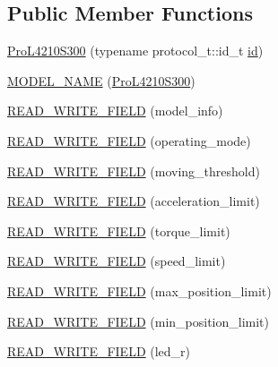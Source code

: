 \subsection*{Public Member Functions}
\begin{DoxyCompactItemize}
\item 
\hyperlink{classdynamixel_1_1servos_1_1_pro_l4210_s300_aac61a7d8079c7f0b1451c407cf445910}{Pro\+L4210\+S300} (typename protocol\+\_\+t\+::id\+\_\+t \hyperlink{classdynamixel_1_1servos_1_1_servo_a2d022081672e25a7bb57b76706e1cc57}{id})
\item 
\hyperlink{classdynamixel_1_1servos_1_1_pro_l4210_s300_a2588c27b6be26cd7cf28cdaf284598e0}{M\+O\+D\+E\+L\+\_\+\+N\+A\+ME} (\hyperlink{classdynamixel_1_1servos_1_1_pro_l4210_s300}{Pro\+L4210\+S300})
\item 
\hyperlink{classdynamixel_1_1servos_1_1_pro_l4210_s300_a21992eb966c85d02c5bb45d357d4ffb7}{R\+E\+A\+D\+\_\+\+W\+R\+I\+T\+E\+\_\+\+F\+I\+E\+LD} (model\+\_\+info)
\item 
\hyperlink{classdynamixel_1_1servos_1_1_pro_l4210_s300_a3d7738f77a3dd53dcb60d88c949d7a84}{R\+E\+A\+D\+\_\+\+W\+R\+I\+T\+E\+\_\+\+F\+I\+E\+LD} (operating\+\_\+mode)
\item 
\hyperlink{classdynamixel_1_1servos_1_1_pro_l4210_s300_a27de98623b0c2542a783fcc20a8985b1}{R\+E\+A\+D\+\_\+\+W\+R\+I\+T\+E\+\_\+\+F\+I\+E\+LD} (moving\+\_\+threshold)
\item 
\hyperlink{classdynamixel_1_1servos_1_1_pro_l4210_s300_a235990010b8fa6bc18942469515ef991}{R\+E\+A\+D\+\_\+\+W\+R\+I\+T\+E\+\_\+\+F\+I\+E\+LD} (acceleration\+\_\+limit)
\item 
\hyperlink{classdynamixel_1_1servos_1_1_pro_l4210_s300_a900d71c327ebe6ed9e8b97c513d6dd18}{R\+E\+A\+D\+\_\+\+W\+R\+I\+T\+E\+\_\+\+F\+I\+E\+LD} (torque\+\_\+limit)
\item 
\hyperlink{classdynamixel_1_1servos_1_1_pro_l4210_s300_aaafe2286d7c07d4fb977f477931319ea}{R\+E\+A\+D\+\_\+\+W\+R\+I\+T\+E\+\_\+\+F\+I\+E\+LD} (speed\+\_\+limit)
\item 
\hyperlink{classdynamixel_1_1servos_1_1_pro_l4210_s300_a08f002a3ae0eb6d9a27a2a72ee49776b}{R\+E\+A\+D\+\_\+\+W\+R\+I\+T\+E\+\_\+\+F\+I\+E\+LD} (max\+\_\+position\+\_\+limit)
\item 
\hyperlink{classdynamixel_1_1servos_1_1_pro_l4210_s300_a5cfe7cd6a40bb1860d876502f30c7b17}{R\+E\+A\+D\+\_\+\+W\+R\+I\+T\+E\+\_\+\+F\+I\+E\+LD} (min\+\_\+position\+\_\+limit)
\item 
\hyperlink{classdynamixel_1_1servos_1_1_pro_l4210_s300_a39ea7fe3e731c7e6f99445e0d4edf7c9}{R\+E\+A\+D\+\_\+\+W\+R\+I\+T\+E\+\_\+\+F\+I\+E\+LD} (led\+\_\+r)

\end{DoxyCompactItemize}
